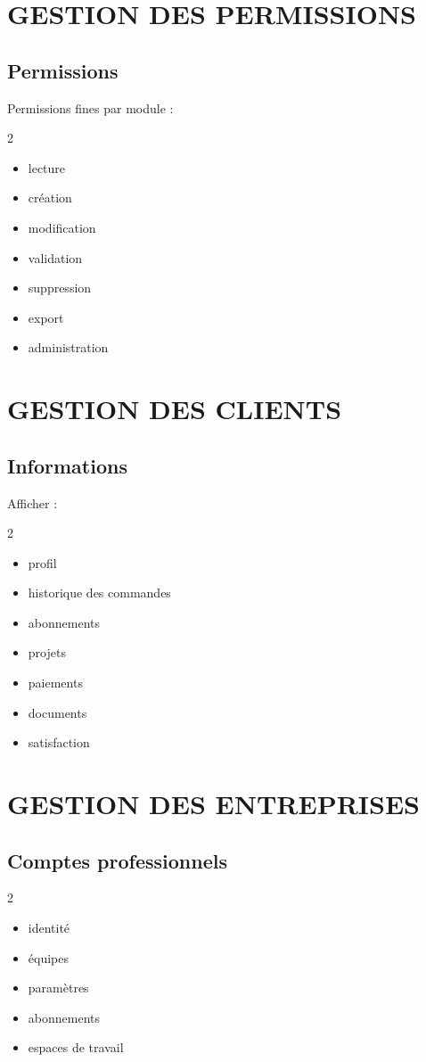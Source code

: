 \documentclass[12pt,a4paper,oneside]{book}
\begin{document}
\chapter{GESTION DES PERMISSIONS}

\section{Permissions}
Permissions fines par module :
\begin{multicols}{2}
\begin{itemize}
\item lecture
\item création
\item modification
\item validation
\item suppression
\item export
\item administration
\end{itemize}
\end{multicols}

\chapter{GESTION DES CLIENTS}

\section{Informations}
Afficher :
\begin{multicols}{2}
\begin{itemize}
\item profil
\item historique des commandes
\item abonnements
\item projets
\item paiements
\item documents
\item satisfaction
\end{itemize}
\end{multicols}

\chapter{GESTION DES ENTREPRISES}

\section{Comptes professionnels}
\begin{multicols}{2}
\begin{itemize}
\item identité
\item équipes
\item paramètres
\item abonnements
\item espaces de travail
\end{itemize}
\end{multicols}
\end{document}
